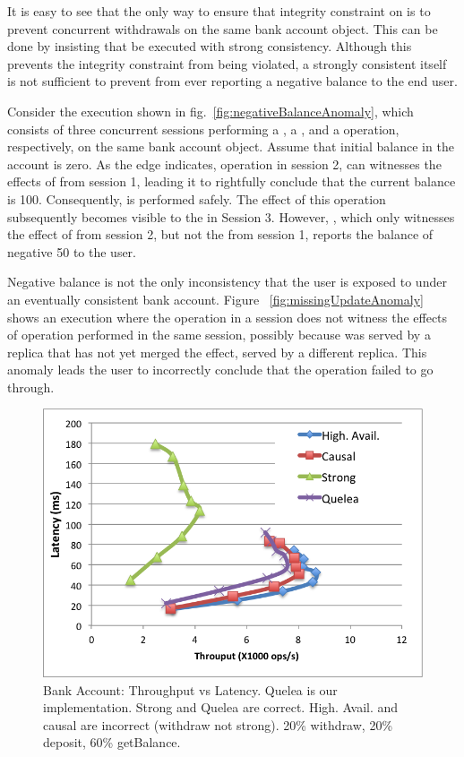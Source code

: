 It is easy to see that the only way to ensure that integrity constraint on
 is to prevent concurrent withdrawals on the same bank account
object. This can be done by insisting that  be executed with
strong consistency. Although this prevents the integrity constraint from being
violated, a strongly consistent  itself is not sufficient to
prevent  from ever reporting a negative balance to the end user.

Consider the execution shown in fig.~\ref{fig:negativeBalanceAnomaly}, which
consists of three concurrent sessions performing a , a
, and a  operation, respectively, on the same bank
account object. Assume that initial balance in the account is zero. As the
 edge indicates, operation  in session 2, can
witnesses the effects of  from session 1, leading it to
rightfully conclude that the current balance is 100. Consequently,
 is performed safely. The effect of this 
operation subsequently becomes visible to the  in Session 3.
However, , which only witnesses the effect of  from
session 2, but not the  from session 1, reports the balance of
negative 50 to the user.

Negative balance is not the only inconsistency that the user is exposed to
under an eventually consistent bank account. Figure
~\ref{fig:missingUpdateAnomaly} shows an execution where the 
operation in a session does not witness the effects of  operation
performed in the same session, possibly because  was served by a
replica that has not yet merged the  effect, served by a different
replica. This anomaly leads the user to incorrectly conclude that the
 operation failed to go through.

\begin{figure}
\centering
\includegraphics[width=\columnwidth]{Graphs/BankAccount_Th_vs_Lat}
\caption{Bank Account: Throughput vs Latency. Quelea is our implementation.
Strong and Quelea are correct. High. Avail. and causal are incorrect (withdraw
not strong). 20\% withdraw, 20\% deposit, 60\% getBalance.}
\label{grf:BankAcc_Th_vs_Lat}
\end{figure}


